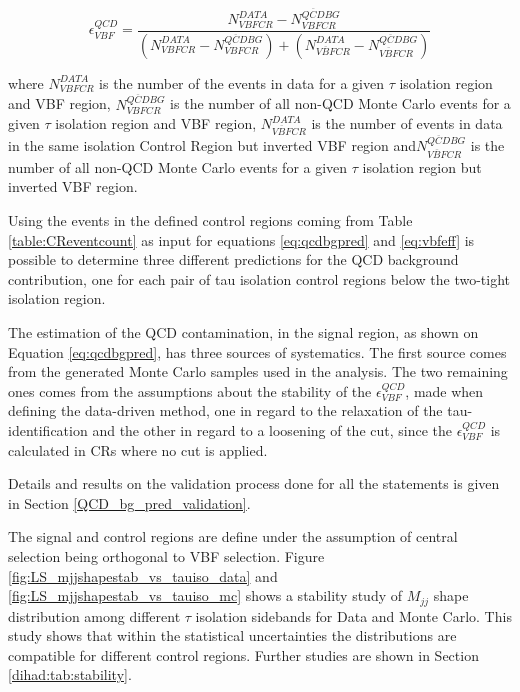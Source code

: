 \begin{equation}
\epsilon^{QCD}_{VBF} = \frac {N^{DATA}_{VBF CR} - N^{\overline{QCD} BG}_{VBFCR}}{\left( N^{DATA}_{VBFCR} - N^{\overline{QCD} BG}_{VBFCR} \right) + \left( N^{DATA}_{\overline{VBF}CR} - N^{\overline{QCD} BG}_{\overline{VBF}CR} \right) }
\label{eq:vbfeff}
\end{equation}

where $N^{DATA}_{VBF CR}$ is the number of the events in data for a given $ \tau $ isolation region and VBF region, $N^{\overline{QCD} BG}_{VBFCR}$ is the number of all non-QCD Monte Carlo events for a given $ \tau $ isolation region and VBF region, $N^{DATA}_{\overline{VBF}CR}$ is the number of events in data in the same isolation Control Region but inverted VBF region and$N^{\overline{QCD} BG}_{\overline{VBF}CR}$ is the number of all non-QCD Monte Carlo events for a given $ \tau $ isolation region but inverted VBF region.

Using the events in the defined control regions coming from Table \ref{table:CReventcount} as input for equations \ref{eq:qcdbgpred} and \ref{eq:vbfeff} is possible to determine three different predictions for the QCD background contribution, one for each pair of tau isolation control regions below the two-tight isolation region.

The estimation of the QCD contamination, in the signal region, as shown on Equation \ref{eq:qcdbgpred}, has three sources of systematics. The first source comes from the generated Monte Carlo samples used in the analysis. The two remaining ones comes from the assumptions about the stability of the $\epsilon^{QCD}_{VBF}$, made when defining the data-driven method, one in regard to the relaxation of the tau-identification and the other in regard to a loosening of the \met cut, since the $\epsilon^{QCD}_{VBF}$ is calculated in CRs where no \met cut is applied.

Details and results on the validation process done for all the statements is given in Section \ref{QCD_bg_pred_validation}.

The signal and control regions are define under the assumption of central selection being orthogonal to VBF selection. Figure \ref{fig:LS_mjjshapestab_vs_tauiso_data} and \ref{fig:LS_mjjshapestab_vs_tauiso_mc} shows a stability study of $M_{jj}$ shape distribution among different $\tau$ isolation sidebands for Data and Monte Carlo. This study shows that within the statistical uncertainties the distributions are compatible for different control regions. Further studies are shown in Section \ref{dihad:tab:stability}.

